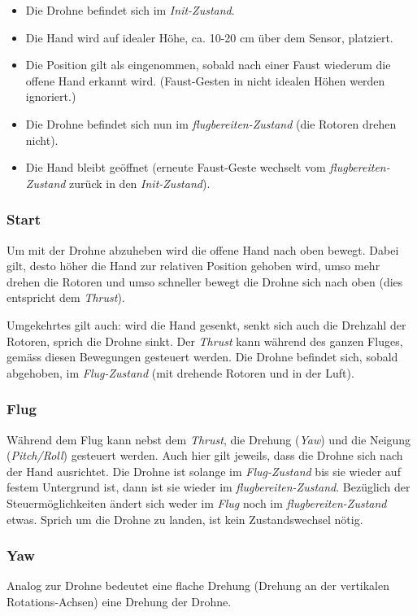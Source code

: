 \begin{itemize}
	\item Die Drohne befindet sich im \textit{Init-Zustand}.
	\item Die Hand wird auf idealer Höhe, ca. 10-20 cm über dem Sensor, platziert.
	\item Die Position gilt als eingenommen, sobald nach einer Faust wiederum die offene Hand erkannt wird. (Faust-Gesten in nicht idealen Höhen werden ignoriert.)
	\item Die Drohne befindet sich nun im \textit{flugbereiten-Zustand} (die Rotoren drehen nicht).
	\item Die Hand bleibt geöffnet (erneute Faust-Geste wechselt vom \textit{flugbereiten-Zustand} zurück in den \textit{Init-Zustand}).
\end{itemize}

\subsubsection{Start}
Um mit der Drohne abzuheben wird die offene Hand nach oben bewegt. Dabei gilt, desto höher die Hand zur relativen Position gehoben wird, umso mehr drehen die Rotoren und umso schneller bewegt die Drohne sich nach oben (dies entspricht dem \textit{Thrust}).

Umgekehrtes gilt auch: wird die Hand gesenkt, senkt sich auch die Drehzahl der Rotoren, sprich die Drohne sinkt.
Der \textit{Thrust} kann während des ganzen Fluges, gemäss diesen Bewegungen gesteuert werden.
Die Drohne befindet sich, sobald abgehoben, im \textit{Flug-Zustand} (mit drehende Rotoren und in der Luft).

\subsubsection{Flug}
Während dem Flug kann nebst dem \textit{Thrust}, die Drehung (\textit{Yaw}) und die Neigung (\textit{Pitch/Roll}) gesteuert werden.
Auch hier gilt jeweils, dass die Drohne sich nach der Hand ausrichtet.
Die Drohne ist solange im \textit{Flug-Zustand} bis sie wieder auf festem Untergrund ist, dann ist sie wieder im \textit{flugbereiten-Zustand}.
Bezüglich der Steuermöglichkeiten ändert sich weder im \textit{Flug} noch im \textit{flugbereiten-Zustand} etwas.
Sprich um die Drohne zu landen, ist kein Zustandswechsel nötig.

\subsubsection{Yaw}
Analog zur Drohne bedeutet eine flache Drehung (Drehung an der vertikalen Rotations-Achsen) eine Drehung der Drohne.

